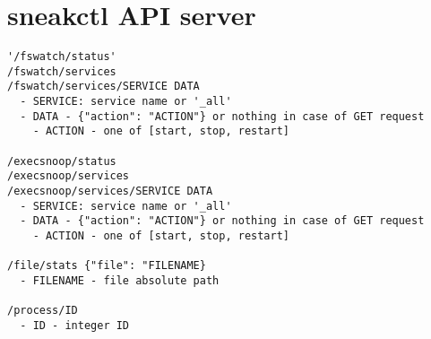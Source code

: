 \setcounter{figure}{0}
\setcounter{listing}{0}

\chapter{sneakctl API server \label{appendix:sneakctl}}

\begin{lstlisting}[language=Clean, style=custom, label=appendix:sneakctl:api, caption={Outline of sneakctl API server endpoints.}]
'/fswatch/status'
/fswatch/services
/fswatch/services/SERVICE DATA
  - SERVICE: service name or '_all'
  - DATA - {"action": "ACTION"} or nothing in case of GET request
    - ACTION - one of [start, stop, restart]

/execsnoop/status
/execsnoop/services
/execsnoop/services/SERVICE DATA
  - SERVICE: service name or '_all'
  - DATA - {"action": "ACTION"} or nothing in case of GET request
    - ACTION - one of [start, stop, restart]
    
/file/stats {"file": "FILENAME}
  - FILENAME - file absolute path
  
/process/ID
  - ID - integer ID
\end{lstlisting}